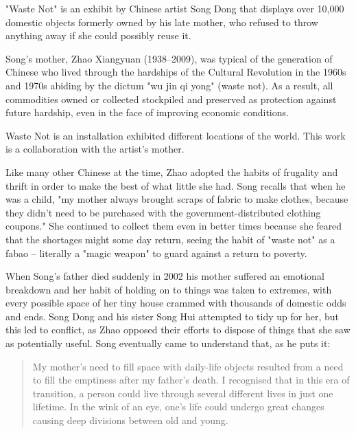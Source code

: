 
"Waste Not" is an exhibit by Chinese artist Song Dong that displays over 10,000 domestic objects formerly owned by his late mother, who refused to throw anything away if she could possibly reuse it. 

Song’s mother, Zhao Xiangyuan (1938–2009), was typical of the generation of Chinese who lived through the hardships of the Cultural Revolution in the 1960s and 1970s abiding by the dictum "wu jin qi yong" (waste not). As a result, all commodities owned or collected stockpiled and preserved as protection against future hardship, even in the face of improving economic conditions.

Waste Not is an installation exhibited different locations of the world. This work is a collaboration with the artist’s mother.

Like many other Chinese at the time, Zhao adopted the habits of frugality and thrift in order to make the best of what little she had. Song recalls that when he was a child, "my mother always brought scraps of fabric to make clothes, because they didn't need to be purchased with the government-distributed clothing coupons." She continued to collect them even in better times because she feared that the shortages might some day return, seeing the habit of "waste not" as a fabao – literally a "magic weapon" to guard against a return to poverty.

When Song's father died suddenly in 2002 his mother suffered an emotional breakdown and her habit of holding on to things was taken to extremes, with every possible space of her tiny house crammed with thousands of domestic odds and ends. Song Dong and his sister Song Hui attempted to tidy up for her, but this led to conflict, as Zhao opposed their efforts to dispose of things that she saw as potentially useful. Song eventually came to understand that, as he puts it:

\begin{quote}
My mother's need to fill space with daily-life objects resulted from a need to fill the emptiness after my father's death. I recognised that in this era of transition, a person could live through several different lives in just one lifetime. In the wink of an eye, one's life could undergo great changes causing deep divisions between old and young.
\end{quote}

